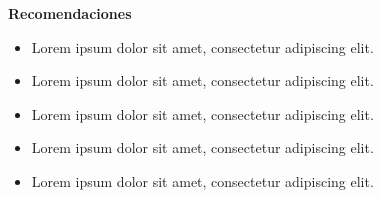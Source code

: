 \newpage
{} %
\vspace*{2cm} %
\begin{center}
	\Huge \textbf{Recomendaciones} %
\end{center}
\doublespacing %
\raggedbottom %
\begin{itemize}
	\item Lorem ipsum dolor sit amet, consectetur adipiscing elit.
	
	\item Lorem ipsum dolor sit amet, consectetur adipiscing elit.
	
	\item Lorem ipsum dolor sit amet, consectetur adipiscing elit.
    
	\item Lorem ipsum dolor sit amet, consectetur adipiscing elit.
	
	\item Lorem ipsum dolor sit amet, consectetur adipiscing elit.
	
\end{itemize}
